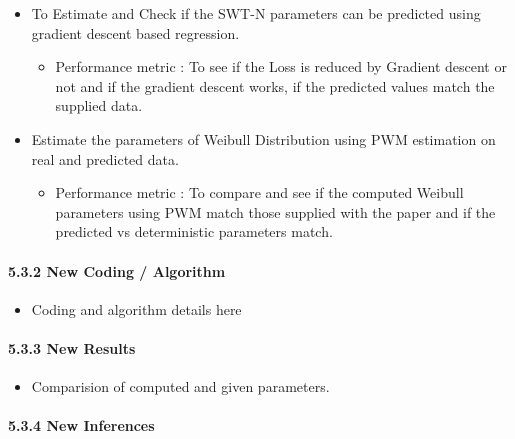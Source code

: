 \documentclass[11pt]{article}
\providecommand{\tightlist}{%
      \setlength{\itemsep}{0pt}\setlength{\parskip}{0pt}}
\begin{document}
\begin{itemize}
\tightlist
\item
  To Estimate and Check if the SWT-N parameters can be predicted using
  gradient descent based regression.

  \begin{itemize}
  \tightlist
  \item
    Performance metric : To see if the Loss is reduced by Gradient
    descent or not and if the gradient descent works, if the predicted
    values match the supplied data.
  \end{itemize}
\item
  Estimate the parameters of Weibull Distribution using PWM estimation
  on real and predicted data.

  \begin{itemize}
  \tightlist
  \item
    Performance metric : To compare and see if the computed Weibull
    parameters using PWM match those supplied with the paper and if the
    predicted vs deterministic parameters match.
  \end{itemize}
\end{itemize}

\hypertarget{new-coding-algorithm}{%
\paragraph{5.3.2 New Coding / Algorithm}\label{new-coding-algorithm}}

\begin{itemize}
\tightlist
\item
  Coding and algorithm details here
\end{itemize}

\hypertarget{new-results}{%
\paragraph{5.3.3 New Results}\label{new-results}}

\begin{itemize}
\tightlist
\item
  Comparision of computed and given parameters.
\end{itemize}

\hypertarget{new-inferences}{%
\paragraph{5.3.4 New Inferences}\label{new-inferences}}
\end{document}
